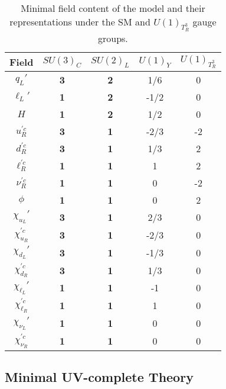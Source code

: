 \begin{table}[h!]
    \centering
    \begin{tabular}{ccccc}
        \hline
        \hline
        Field & $SU(3)_C$  & $SU(2)_L$ & $U(1)_Y$ & $U(1)_{T^3_R}$ \\
        \hline\hline
        $q_L'$                    & \textbf{3} & \textbf{2} & 1/6 & 0\\
        $\ell_L'$                 & \textbf{1} & \textbf{2} & -1/2 & 0\\
        $H$                       & \textbf{1} & \textbf{2} & 1/2 & 0\\
        \hline
        $u_R^{\prime c}$          & \textbf{3} & \textbf{1} & -2/3 & -2\\
        $d_R^{\prime c}$          & \textbf{3} & \textbf{1} & 1/3 & 2\\
        $\ell_R^{\prime c}$       & \textbf{1} & \textbf{1} & 1 & 2\\
        $\nu_R^{\prime c}$        & \textbf{1} & \textbf{1} & 0 & -2\\
        $\phi$                    & \textbf{1} & \textbf{1} & 0 & 2\\
        \hline
        $\chi_{u_L}'$             & \textbf{3} & \textbf{1} & 2/3 & 0\\
        $\chi_{u_R}^{\prime c}$   & \textbf{3} & \textbf{1} & -2/3 & 0\\
        $\chi_{d_L}'$             & \textbf{3} & \textbf{1} & -1/3 & 0\\
        $\chi_{d_R}^{\prime c}$   & \textbf{3} & \textbf{1} & 1/3 & 0\\
        $\chi_{\ell_L}'$          & \textbf{1} & \textbf{1} & -1 & 0\\
        $\chi_{\ell_R}^{\prime c}$& \textbf{1} & \textbf{1} & 1 & 0\\
        $\chi_{\nu_L}'$           & \textbf{1} & \textbf{1} & 0 & 0\\
        $\chi_{\nu_R}^{\prime c}$ & \textbf{1} & \textbf{1} & 0 & 0\\
        \hline
        \hline
    \end{tabular}
    \caption{Minimal field content of the model and their representations under the SM and $U(1)_{T^3_R}$ gauge groups.}
    \label{tab:QMnumbers}
\end{table}

\subsection{Minimal UV-complete Theory}

